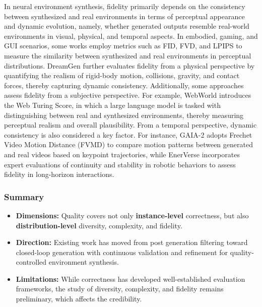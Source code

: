 \documentclass{llmxive}
\begin{document}
In neural environment synthesis, fidelity primarily depends on the consistency between synthesized and real environments in terms of perceptual appearance and dynamic evolution, namely, whether generated outputs resemble real-world environments in visual, physical, and temporal aspects. In embodied, gaming, and GUI scenarios, some works \cite{DIAMOND, GameNGen, GAIA-2} employ metrics such as FID, FVD, and LPIPS to measure the similarity between synthesized and real environments in perceptual distributions. DreamGen \cite{DreamGen} further evaluates fidelity from a physical perspective by quantifying the realism of rigid-body motion, collisions, gravity, and contact forces, thereby capturing dynamic consistency. Additionally, some approaches assess fidelity from a subjective perspective. For example, WebWorld \cite{WebWorld} introduces the Web Turing Score, in which a large language model is tasked with distinguishing between real and synthesized environments, thereby measuring perceptual realism and overall plausibility. From a temporal perspective, dynamic consistency is also considered a key factor. For instance, GAIA-2 \cite{GAIA-2} adopts Frechet Video Motion Distance (FVMD) to compare motion patterns between generated and real videos based on keypoint trajectories, while EnerVerse \cite{EnerVerse} incorporates expert evaluations of continuity and stability in robotic behaviors to assess fidelity in long-horizon interactions.



\subsubsection{Summary}
\begin{tcolorbox}[takeaway,title={Takeaway 5.3}]
\begin{itemize}
\item \textbf{Dimensions:} Quality covers not only \textbf{instance-level} correctness, but also \textbf{distribution-level} diversity, complexity, and fidelity.

\item \textbf{Direction:} Existing work has moved from post generation filtering toward closed-loop generation with continuous validation and refinement for quality-controlled environment synthesis.

\item \textbf{Limitations:} While correctness has developed well-established evaluation frameworks, the study of diversity, complexity, and fidelity remains preliminary, which affects the credibility.
\end{itemize}
\end{tcolorbox}
\end{document}
